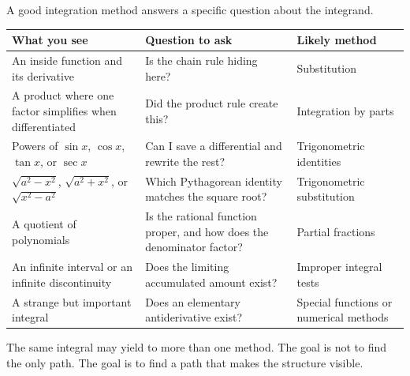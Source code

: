 A good integration method answers a specific question about the integrand.

\begin{center}
\begin{tabular}{p{}|p{}|p{}}
\textbf{What you see} & \textbf{Question to ask} & \textbf{Likely method} \\ \hline
An inside function and its derivative & Is the chain rule hiding here? & Substitution \\[5pt]
A product where one factor simplifies when differentiated & Did the product rule create this? & Integration by parts \\[5pt]
Powers of \(\sin x\), \(\cos x\), \(\tan x\), or \(\sec x\) & Can I save a differential and rewrite the rest? & Trigonometric identities \\[5pt]
\(\sqrt{a^2-x^2}\), \(\sqrt{a^2+x^2}\), or \(\sqrt{x^2-a^2}\) & Which Pythagorean identity matches the square root? & Trigonometric substitution \\[5pt]
A quotient of polynomials & Is the rational function proper, and how does the denominator factor? & Partial fractions \\[5pt]
An infinite interval or an infinite discontinuity & Does the limiting accumulated amount exist? & Improper integral tests \\[5pt]
A strange but important integral & Does an elementary antiderivative exist? & Special functions or numerical methods
\end{tabular}
\end{center}

The same integral may yield to more than one method.  The goal is not to find the only
path.  The goal is to find a path that makes the structure visible.

